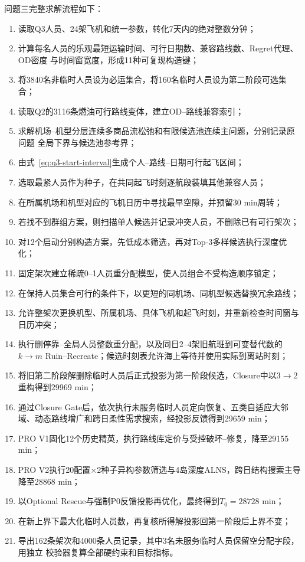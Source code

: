 \documentclass[UTF8,a4paper,zihao=5]{ctexart}
\begin{document}
问题三完整求解流程如下：
\begin{enumerate}[label=\textbf{步骤\arabic*.},leftmargin=4.5em]
  \item 读取Q3人员、24架飞机和统一参数，转化7天内的绝对整数分钟；
  \item 计算每名人员的乐观最短运输时间、可行日期数、兼容路线数、Regret代理、OD密度
  与时间窗宽度，形成11种可复现构造键；
  \item 将3840名非临时人员设为必运集合，将160名临时人员设为第二阶段可选集合；
  \item 读取Q2的3116条燃油可行路线变体，建立OD--路线兼容索引；
  \item 求解机场--机型分层连续多商品流松弛和有限候选池连续主问题，分别记录原问题
  全局下界与候选池参考界；
  \item 由式~\eqref{eq:q3-start-interval}生成个人--路线--日期可行起飞区间；
  \item 选取最紧人员作为种子，在共同起飞时刻逐航段装填其他兼容人员；
  \item 在所属机场和机型对应的飞机日历中寻找最早空隙，并预留30 min周转；
  \item 若找不到群组方案，则扫描单人候选并记录冲突人员，不删除已有可行架次；
  \item 对12个启动分别构造方案，先低成本筛选，再对Top-$3$多样候选执行深度优化；
  \item 固定架次建立稀疏0--1人员重分配模型，使人员组合不受构造顺序锁定；
  \item 在保持人员集合可行的条件下，以更短的同机场、同机型候选替换冗余路线；
  \item 允许整架次更换机型、所属机场、具体飞机和起飞时刻，并重新检查时间窗与日历冲突；
  \item 执行删停靠--全局人员整数重分配，以及同日2--4架旧航班到可变替代数的
  $k\to m$ Ruin--Recreate；候选时刻表允许海上等待并使用实际到离站时刻；
  \item 将旧第二阶段解删除临时人员后正式投影为第一阶段候选，Closure中以$3\to2$重构得到29969 min；
  \item 通过Closure Gate后，依次执行未服务临时人员定向恢复、五类自适应大邻域、动态路线增广和跨日柔性需求搜索，经投影反馈得到29659 min；
  \item PRO V1固化12个历史精英，执行路线库定价与受控破坏--修复，降至29155 min；
  \item PRO V2执行20配置$\times$2种子异构参数筛选与4岛深度ALNS，跨日结构搜索主导降至28868 min；
  \item 以Optional Rescue与强制P0反馈投影再优化，最终得到$T_0=28728$ min；
  \item 在新上界下最大化临时人员数，再复核所得解投影回第一阶段后上界不变；
  \item 导出162条架次和4000条人员记录，其中3名未服务临时人员保留空分配字段，用独立
  校验器复算全部硬约束和目标指标。
\end{enumerate}
\end{document}

